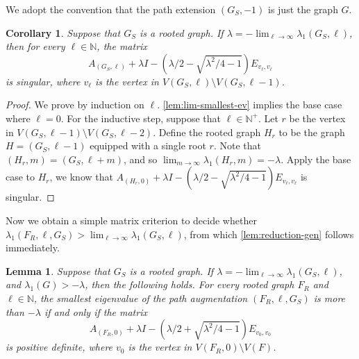 \documentclass[11pt]{article}
\newtheorem{corollary}[theorem]{Corollary}
\newtheorem{lemma}[theorem]{Lemma}
\theoremstyle{definition}
\theoremstyle{remark}
\newcommand{\la}{\lambda}
\newcommand{\N}{\mathbb{N}}
\begin{document}
We adopt the convention that the path extension $(G_S, -1)$ is just the graph $G$.

\begin{corollary} \label{cor:ga}
    Suppose that $G_S$ is a rooted graph. If $\la = -\lim_{\ell \to \infty} \la_1(G_S, \ell)$, then for every $\ell \in \N$, the matrix
    \[
        A_{(G_S, \ell)} + \la I - \left(\la/2 - \sqrt{\la^2/4-1}\right) E_{v_\ell,v_\ell}
    \]
    is singular, where $v_\ell$ is the vertex in $V(G_S, \ell)\setminus V(G_S, \ell-1)$.
\end{corollary}

\begin{proof}
    We prove by induction on $\ell$. \cref{lem:lim-smallest-ev} implies the base case where $\ell = 0$. For the inductive step, suppose that $\ell \in \N^+$. Let $r$ be the vertex in $V(G_S, \ell-1) \setminus V(G_S,\ell-2)$. Define the rooted graph $H_r$ to be the graph $H = (G_S, \ell-1)$ equipped with a single root $r$. Note that $(H_r, m) = (G_S, \ell + m)$, and so $\lim_{m\to\infty}\la_1(H_r, m) = -\la$. Apply the base case to $H_r$, we know that $A_{(H_r,0)} + \la I - (\la/2-\sqrt{\la^2/4-1})E_{v_\ell,v_\ell}$ is singular.
\end{proof}

Now we obtain a simple matrix criterion to decide whether $\la_1(F_R, \ell, G_S) > \lim_{\ell \to \infty}\la_1(G_S, \ell)$, from which \cref{lem:reduction-gen} follows immediately.

\begin{lemma} \label{thm:matrix}
    Suppose that $G_S$ is a rooted graph. If $\la = -\lim_{\ell \to \infty}\la_1(G_S, \ell)$, and $\la_1(G)> -\la$, then the following holds. For every rooted graph $F_R$ and $\ell \in \N$, the smallest eigenvalue of the path augmentation $(F_R, \ell, G_S)$ is more than $-\la$ if and only if the matrix
    \[
        A_{(F_R, 0)} + \la I - \left(\la/2 + \sqrt{\la^2/4-1}\right) E_{v_0,v_0}
    \]
    is positive definite, where $v_0$ is the vertex in $V(F_R, 0) \setminus V(F)$.
\end{lemma}
\end{document}
